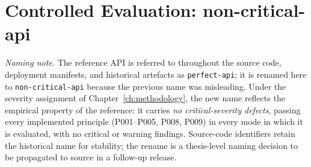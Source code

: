 \begin{table}[htbp]
\centering
\caption{Automated SDT pipeline versus the manual equivalent it replaces. Automated values are measured in the PoC; manual values are engineering estimates (no manual control arm was run).}
\label{tab:sdt-vs-manual}
\small
{}
\end{table}

\section{Controlled Evaluation: non-critical-api}
\label{sec:controlled-eval}

\textit{Naming note.} The reference API is referred to throughout the source code, deployment manifests, and historical artefacts as \texttt{perfect-api}; it is renamed here to \texttt{non-critical-api} because the previous name was misleading. Under the severity assignment of Chapter~\ref{ch:methodology}, the new name reflects the empirical property of the reference: it carries \emph{no critical-severity defects}, passing every implemented principle (P001--P005, P008, P009) in every mode in which it is evaluated, with no critical or warning findings. Source-code identifiers retain the historical name for stability; the rename is a thesis-level naming decision to be propagated to source in a follow-up release.


